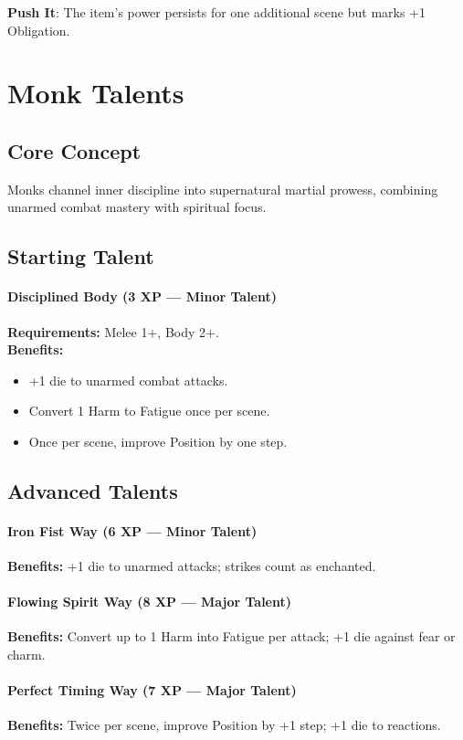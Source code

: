 \textbf{Push It}: The item's power persists for one additional scene but marks +1 Obligation.

\section{Monk Talents}
\label{sec:monk-talents}

\subsection*{Core Concept}
Monks channel inner discipline into supernatural martial prowess, combining unarmed combat mastery with spiritual focus.

\subsection*{Starting Talent}
\paragraph{Disciplined Body (3 XP --- Minor Talent)} 
\textbf{Requirements:} Melee 1+, Body 2+. \\
\textbf{Benefits:}
\begin{itemize}
  \item +1 die to unarmed combat attacks.
  \item Convert 1 Harm to Fatigue once per scene.
  \item Once per scene, improve Position by one step.
\end{itemize}

\subsection*{Advanced Talents}
\paragraph{Iron Fist Way (6 XP --- Minor Talent)} 
\textbf{Benefits:} +1 die to unarmed attacks; strikes count as enchanted.

\paragraph{Flowing Spirit Way (8 XP --- Major Talent)} 
\textbf{Benefits:} Convert up to 1 Harm into Fatigue per attack; +1 die against fear or charm.

\paragraph{Perfect Timing Way (7 XP --- Major Talent)} 
\textbf{Benefits:} Twice per scene, improve Position by +1 step; +1 die to reactions.

